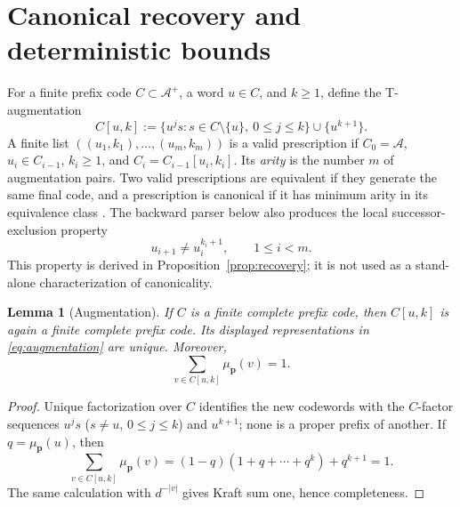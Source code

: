 \documentclass[journal]{IEEEtran}
\theoremstyle{plain}
\newtheorem{lemma}[theorem]{Lemma}
\theoremstyle{definition}
\theoremstyle{remark}
\newcommand{\A}{\mathcal A}
\newcommand{\muP}{\mu_{\mathbf p}}
\begin{document}
\section{Canonical recovery and deterministic bounds}\label{sec:deterministic}

For a finite prefix code $C\subset\A^+$, a word $u\in C$, and $k\ge1$, define the T-augmentation
\begin{equation}\label{eq:augmentation}
 C[u,k]:=\{u^js:s\in C\setminus\{u\},\ 0\le j\le k\}
 \cup\{u^{k+1}\}.
\end{equation}
A finite list $((u_1,k_1),\ldots,(u_m,k_m))$ is a valid prescription if $C_0=\A$, $u_i\in C_{i-1}$, $k_i\ge1$, and $C_i=C_{i-1}[u_i,k_i]$.  Its \emph{arity} is the number $m$ of augmentation pairs.  Two valid prescriptions are equivalent if they generate the same final code, and a prescription is canonical if it has minimum arity in its equivalence class \cite[pp.~446--448]{TitchenerEtAl2005}.  The backward parser below also produces the local successor-exclusion property
\begin{equation}\label{eq:canonical-condition}
 u_{i+1}\ne u_i^{k_i+1},\qquad 1\le i<m.
\end{equation}
This property is derived in Proposition~\ref{prop:recovery}; it is not used as a stand-alone characterization of canonicality.

\begin{lemma}[Augmentation]\label{lem:augmentation}
If $C$ is a finite complete prefix code, then $C[u,k]$ is again a finite complete prefix code.  Its displayed representations in \eqref{eq:augmentation} are unique.  Moreover,
\begin{equation}\label{eq:augmentation-weight}
 \sum_{v\in C[u,k]}\muP(v)=1.
\end{equation}
\end{lemma}

\begin{proof}
Unique factorization over $C$ identifies the new codewords with the $C$-factor sequences $u^js$ ($s\ne u$, $0\le j\le k$) and $u^{k+1}$; none is a proper prefix of another.  If $q=\muP(u)$, then
\begin{equation*}
 \sum_{v\in C[u,k]}\muP(v)
 =(1-q)(1+q+\cdots+q^k)+q^{k+1}=1.
\end{equation*}
The same calculation with $d^{-|v|}$ gives Kraft sum one, hence completeness.
\end{proof}
\end{document}
